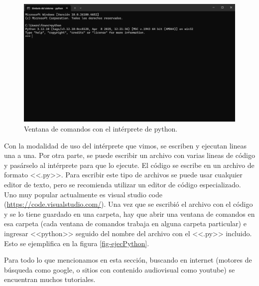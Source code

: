 \documentclass[a4paper, 12pt]{report}
\theoremstyle{definition}
\begin{document}
\begin{figure}
	\centering
	\includegraphics[scale=0.5]{cmdPython.png}
	\caption{Ventana de comandos con el intérprete de python.}
	\label{fig-cmdPython}
\end{figure}

Con la modalidad de uso del intérprete que vimos, se escriben y ejecutan lineas una a una. Por otra parte, se puede escribir un archivo con varias lineas de código y pasárselo al intérprete para que lo ejecute. El código se escribe en un archivo de formato <<.py>>. Para escribir este tipo de archivos se puede usar cualquier editor de texto, pero se recomienda utilizar un editor de código especializado. Uno muy popular actualmente es visual studio code (\href{https://code.visualstudio.com/}{https://code.visualstudio.com/}). Una vez que se escribió el archivo con el código y se lo tiene guardado en una carpeta, hay que abrir una ventana de comandos en esa carpeta (cada ventana de comandos trabaja en alguna carpeta particular) e ingresar <<python>> seguido del nombre del archivo con el <<.py>> incluido. Esto se ejemplifica en la figura \ref{fig-ejecPython}.

Para todo lo que mencionamos en esta sección, buscando en internet (motores de búsqueda como google, o sitios con contenido audiovisual como youtube) se encuentran muchos tutoriales. 
\end{document}
